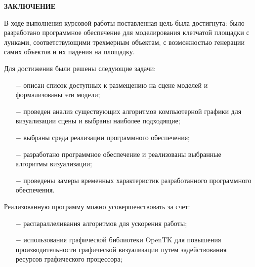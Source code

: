 \begin{center}
    \textbf{ЗАКЛЮЧЕНИЕ}
\end{center}

В ходе выполнения курсовой работы поставленная цель была достигнута: было разработано программное обеспечение для моделирования клетчатой площадки с лунками, соответствующими трехмерным объектам, с возможностью генерации самих объектов и их падения на площадку.

Для достижения были решены следующие задачи:
\begin{itemize}
    \item[$-$] описан список доступных к размещению на сцене моделей и формализованы эти модели;
    \item[$-$] проведен анализ существующих алгоритмов компьютерной графики для визуализации сцены и выбраны наиболее подходящие;
    \item[$-$] выбраны среда реализации программного обеспечения;
    \item[$-$] разработано программное обеспечение и реализованы выбранные алгоритмы визуализации;
    \item[$-$] проведены замеры временных характеристик разработанного программного обеспечения.
\end{itemize}

\vspace{5mm}

Реализованную программу можно усовершенствовать за счет:
\begin{itemize}
    \item[$-$] распараллеливания алгоритмов для ускорения работы;
    \item[$-$] использования графической библиотеки OpenTK для повышения производительности графической визуализации путем задействования ресурсов графического процессора;
\end{itemize}